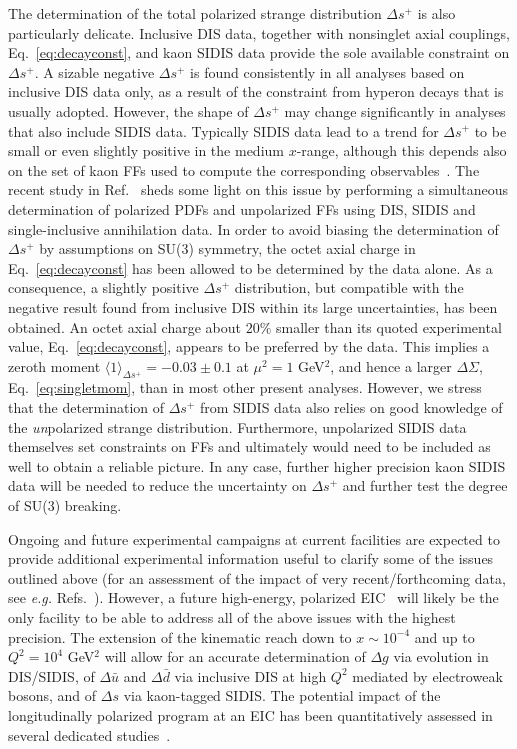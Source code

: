 The determination of the total polarized strange distribution $\Delta s^+$ is 
also particularly delicate.
%
Inclusive DIS data, together with nonsinglet axial couplings, 
Eq.~\eqref{eq:decayconst}, and kaon SIDIS data provide the sole available 
constraint on $\Delta s^+$.
%
A sizable negative $\Delta s^+$ is found 
consistently in all analyses based on inclusive DIS data only, as a result 
of the constraint from hyperon decays that is usually adopted. 
%
However, the shape of $\Delta s^+$ may change significantly in analyses that also include
SIDIS data. Typically SIDIS data lead to a trend for $\Delta s^+$ to be
small or even slightly positive in the medium $x$-range, although this depends 
also on the set of kaon FFs used to compute
the corresponding observables~\cite{Leader:2011tm}.  
%
The recent study in Ref.~\cite{Ethier:2017zbq} sheds some light on this issue
by performing a simultaneous determination of polarized PDFs and unpolarized 
FFs using DIS, SIDIS and single-inclusive annihilation data.
%
In order to avoid biasing the determination of $\Delta s^+$ by 
assumptions on SU(3) symmetry, the octet axial charge in 
Eq.~\eqref{eq:decayconst} has been allowed to be determined by the data alone.
%
As a consequence, a slightly positive $\Delta s^+$ distribution, but
compatible with the negative result found from inclusive DIS within its 
large uncertainties, has been obtained.
% 
An octet axial charge about $20\%$ smaller than its quoted experimental value, 
Eq.~\eqref{eq:decayconst}, appears to be preferred by the data.
%
This implies a zeroth moment $\langle 1\rangle_{\Delta s^+}=-0.03 \pm 0.1$ at 
$\mu^2=1$ GeV$^2$, and hence a larger $\Delta\Sigma$, Eq.~\eqref{eq:singletmom},
than in most other present analyses.
%
However, we stress that the determination of $\Delta s^+$ from SIDIS data 
also relies on good knowledge of the {\it un}polarized strange distribution. 
%
Furthermore, unpolarized SIDIS data themselves set constraints on 
FFs and ultimately would need to be included as well
to obtain a reliable picture. 
%
In any case, further higher precision kaon SIDIS data will be needed 
to reduce the uncertainty on $\Delta s^+$ and further test the degree of 
SU(3) breaking. 

Ongoing and future experimental campaigns at current facilities are
expected to provide additional experimental information
useful to clarify some of the issues outlined above (for an 
assessment of the impact of very recent/forthcoming data, see {\it e.g.}
Refs.~\cite{Aschenauer:2015eha,Aschenauer:2015ata,Nocera:2015vva,
Nocera:2017wep}).
%
However, a future high-energy, polarized EIC~\cite{Accardi:2012qut} will 
likely be the only facility to be able to address all of the above issues 
with the highest precision. 
% 
The extension of the kinematic reach down to $x\sim 10^{-4}$ and up to
$Q^2=10^4$ GeV$^2$ will allow for an accurate determination of $\Delta g$
via evolution in DIS/SIDIS, of $\Delta\bar{u}$ and 
$\Delta\bar{d}$ via inclusive DIS at high $Q^2$ mediated by electroweak bosons,
and of $\Delta s$ via kaon-tagged SIDIS. 
%
The potential impact of the longitudinally polarized program at an EIC
has been quantitatively assessed in several dedicated 
studies~\cite{Aschenauer:2012ve,Ball:2013tyh,Aschenauer:2013iia,
Aschenauer:2015ata}.

